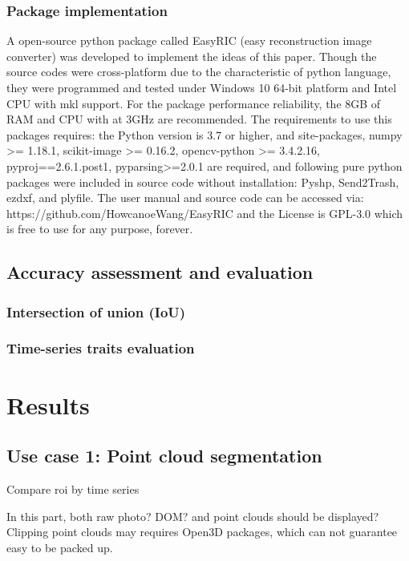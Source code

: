 \documentclass[sensors,article,submit,moreauthors, xelatex]{Definitions/mdpi}
\begin{document}
\subsubsection{Package implementation}
A open-source python \cite{guido_python_2018} package called EasyRIC (easy reconstruction image converter) was developed to implement the ideas of this paper. Though the source codes were cross-platform due to the characteristic of python language, they were programmed and tested under Windows 10 64-bit platform and Intel CPU with \acrfull*{mkl} support. For the package performance reliability, the 8GB of RAM and CPU with at 3GHz are recommended. The requirements to use this packages requires: the Python version is 3.7 or higher, and site-packages, numpy >= 1.18.1, scikit-image >= 0.16.2, opencv-python >= 3.4.2.16, pyproj==2.6.1.post1, pyparsing>=2.0.1 are required, and following pure python packages were included in source code without installation: Pyshp, Send2Trash, ezdxf, and plyfile. The user manual and source code can be accessed via: https://github.com/HowcanoeWang/EasyRIC and the License is GPL-3.0 which is free to use for any purpose, forever.

\subsection{Accuracy assessment and evaluation}
\subsubsection{Intersection of union (IoU)}

\subsubsection{Time-series traits evaluation}


\section{Results}

\subsection{Use case 1: Point cloud segmentation}
Compare \acrshort*{roi} by time series

In this part, both raw photo? DOM? and point clouds should be displayed? Clipping point clouds may requires Open3D packages, which can not guarantee easy to be packed up.
\end{document}
